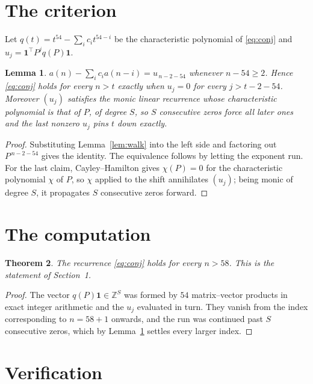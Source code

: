 \documentclass[11pt,a4paper]{article}
\theoremstyle{plain}
\newtheorem{theorem}{Theorem}
\newtheorem{lemma}[theorem]{Lemma}
\theoremstyle{definition}
\begin{document}
\section{The criterion}

Let $q(t)=t^{54}-\sum_i c_i t^{54-i}$ be the characteristic polynomial of
\eqref{eq:conj} and $u_j=\mathbf{1}^{\!\top}P^{j}q(P)\mathbf{1}$.

\begin{lemma}\label{lem:crit}
$a(n)-\sum_i c_i a(n-i)=u_{\,n-2-54}$ whenever $n-54\ge2$. Hence
\eqref{eq:conj} holds for every $n>t$ exactly when $u_j=0$ for every
$j>t-2-54$. Moreover $(u_j)$ satisfies the monic linear recurrence whose
characteristic polynomial is that of $P$, of degree $S$, so $S$ consecutive zeros force all
later ones and the last nonzero $u_j$ pins $t$ down exactly.
\end{lemma}

\begin{proof}
Substituting Lemma~\ref{lem:walk} into the left side and factoring out
$P^{\,n-2-54}$ gives the identity. The equivalence follows by letting the exponent
run. For the last claim, Cayley--Hamilton gives $\chi(P)=0$ for the characteristic
polynomial $\chi$ of $P$, so $\chi$ applied to the shift annihilates $(u_j)$; being monic of
degree $S$, it propagates $S$ consecutive zeros forward.
\end{proof}

\section{The computation}

\begin{theorem}
The recurrence \eqref{eq:conj} holds for every $n>58$. This is the statement of
Section~1.
\end{theorem}

\begin{proof}
The vector $q(P)\mathbf{1}\in\mathbb{Z}^{S}$ was formed by $54$ matrix--vector
products in exact integer arithmetic and the $u_j$ evaluated in turn. They vanish from the
index corresponding to $n=58+1$ onwards, and the run was continued past $S$ consecutive
zeros, which by Lemma~\ref{lem:crit} settles every larger index.
\end{proof}

\section{Verification}
\end{document}
